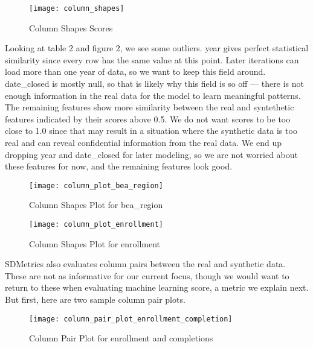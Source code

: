 \documentclass[sigconf, authorversion, nonacm]{acmart}
\begin{document}
    \begin{figure}[h]
        \centering
        \caption{Column Shapes Scores}
        \texttt{[image: column\_shapes]}
    \end{figure}

    Looking at table 2 and figure 2, we see some outliers. year gives perfect statistical similarity since every row has the same value at this point. Later iterations can load more than one year of data, so we want to keep this field around. date\_closed is mostly null, so that is likely why this field is so off --- there is not enough information in the real data for the model to learn meaningful patterns. The remaining features show more similarity between the real and syntethetic features indicated by their scores above 0.5. We do not want scores to be too close to 1.0 since that may result in a situation where the synthetic data is too real and can reveal confidential information from the real data. We end up dropping year and date\_closed for later modeling, so we are not worried about these features for now, and the remaining features look good.

    \begin{figure}[h]
        \centering
        \caption{Column Shapes Plot for bea\_region}
        \texttt{[image: column\_plot\_bea\_region]}
    \end{figure}

    \begin{figure}[h]
        \centering
        \caption{Column Shapes Plot for enrollment}
        \texttt{[image: column\_plot\_enrollment]}
    \end{figure}

    SDMetrics also evaluates column pairs between the real and synthetic data. These are not as informative for our current focus, though we would want to return to these when evaluating machine learning score, a metric we explain next. But first, here are two sample column pair plots.

    \begin{figure}[h]
        \centering
        \caption{Column Pair Plot for enrollment and completions}
        \texttt{[image: column\_pair\_plot\_enrollment\_completion]}
    \end{figure}
\end{document}

